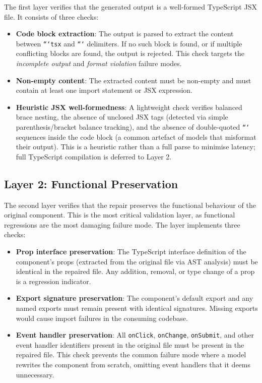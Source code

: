 The first layer verifies that the generated output is a well-formed TypeScript
JSX file.  It consists of three checks:

\begin{itemize}
  \item \textbf{Code block extraction}: The output is parsed to extract the
    content between \texttt{```tsx} and \texttt{```} delimiters.  If no such
    block is found, or if multiple conflicting blocks are found, the output is
    rejected.  This check targets the \emph{incomplete output} and
    \emph{format violation} failure modes.
  \item \textbf{Non-empty content}: The extracted content must be non-empty
    and must contain at least one import statement or JSX expression.
  \item \textbf{Heuristic JSX well-formedness}: A lightweight check verifies
    balanced brace nesting, the absence of unclosed JSX tags (detected via
    simple parenthesis/bracket balance tracking), and the absence of
    double-quoted \texttt{```} sequences inside the code block (a common
    artefact of models that misformat their output).  This is a heuristic
    rather than a full parse to minimise latency; full TypeScript compilation
    is deferred to Layer 2.
\end{itemize}

\subsection{Layer 2: Functional Preservation}

The second layer verifies that the repair preserves the functional behaviour
of the original component.  This is the most critical validation layer, as
functional regressions are the most damaging failure mode.  The layer
implements three checks:

\begin{itemize}
  \item \textbf{Prop interface preservation}: The TypeScript interface
    definition of the component's props (extracted from the original file via
    AST analysis) must be identical in the repaired file.  Any addition,
    removal, or type change of a prop is a regression indicator.
  \item \textbf{Export signature preservation}: The component's default export
    and any named exports must remain present with identical signatures.
    Missing exports would cause import failures in the consuming codebase.
  \item \textbf{Event handler preservation}: All \texttt{onClick}, \texttt{onChange},
    \texttt{onSubmit}, and other event handler identifiers present in the
    original file must be present in the repaired file.  This check prevents
    the common failure mode where a model rewrites the component from scratch,
    omitting event handlers that it deems unnecessary.
\end{itemize}

